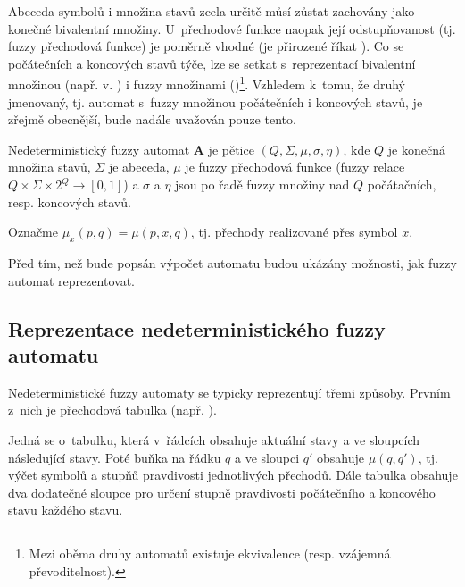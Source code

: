 Abeceda symbolů i množina stavů zcela určitě můsí zůstat zachovány jako konečné bivalentní množiny. U~přechodové funkce naopak její odstupňovanost (tj. fuzzy přechodová funkce) je poměrně vhodné (je přirozené říkat ). Co se počátečních a koncových stavů týče, lze se setkat s~reprezentací bivalentní množinou (např. v. \cite{AndAbdAsm-ApprPattMatcFuzzLog, SnaKepAbrHas-AproxStriMatchFuzzAut}) i fuzzy množinami (\cite{StaCir-ConsFuzzAutFuzzRegExp, AstGariGonVillFar-ApprStrMatUsiDefFuzzAutLearExpr, Bel-DetFuzAut, GonGar-FuzzLangInfRanAccGuzzAutPumLemDetProc})\footnote{Mezi oběma druhy automatů existuje ekvivalence (resp. vzájemná převoditelnost).}. Vzhledem k~tomu, že druhý jmenovaný, tj. automat s~fuzzy množinou počátečních i koncových stavů, je zřejmě obecnější, bude nadále uvažován pouze tento.

\begin{definition}\label{def-ZaklDefNedFuzzAut}
 Nedeterministický fuzzy automat $\mathbf{A}$ je pětice $(Q, \Sigma, \mu, \sigma, \eta)$, kde $Q$ je konečná množina stavů, $\Sigma$ je abeceda, $\mu$ je fuzzy přechodová funkce (fuzzy relace $Q \times \Sigma \times 2^Q \rightarrow [0, 1]$) a $\sigma$ a $\eta$ jsou po řadě fuzzy množiny nad $Q$ počátačních, resp. koncových stavů.
\end{definition}

\begin{notation} \label{not:muOverSym}
 Označme $\mu_x(p, q) = \mu(p, x, q)$, tj. přechody realizované přes symbol $x$.
\end{notation}

Před tím, než bude popsán výpočet automatu budou ukázány možnosti, jak fuzzy automat reprezentovat.

\subsection{Reprezentace nedeterministického fuzzy automatu}
Nedeterministické fuzzy automaty se typicky reprezentují třemi způsoby. Prvním z~nich je přechodová tabulka (např. \cite{DooKre-NewDirFuzzAut}). 

Jedná se o~tabulku, která v~řádcích obsahuje aktuální stavy a ve sloupcích následující stavy. Poté buňka na řádku $q$ a ve sloupci $q'$ obsahuje $\mu(q, q')$, tj. výčet symbolů a stupňů pravdivosti jednotlivých přechodů. Dále tabulka obsahuje dva dodatečné sloupce pro určení stupně pravdivosti počátečního a koncového stavu každého stavu.

